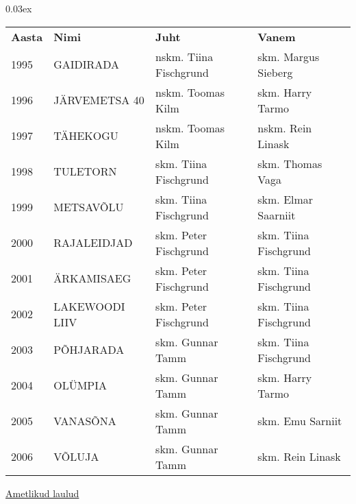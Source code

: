 \documentclass[10pt]{book}
\begin{document}
{\centering\scriptsize\arrayrulewidth 0.03ex
\begin{tabular*}{1.0\textwidth}{@{\extracolsep{\fill}}@{}l@{}@{}l@{}@{}l@{}@{}l@{}}
\bf{Aasta}	&	\bf{Nimi}				&	\bf{Juht}				&	\bf{Vanem}\\[2mm]
	1995	&	GAIDIRADA				&	nskm. Tiina Fischgrund	&	skm.  Margus Sieberg\\[2mm]
	1996	&	J\"ARVEMETSA 40			&	nskm. Toomas Kilm		&	skm. Harry Tarmo\\[2mm]
	1997	&	T\"AHEKOGU				&	nskm. Toomas Kilm		&	nskm. Rein Linask\\[2mm]
	1998	&	TULETORN				&	skm. Tiina Fischgrund	&	skm. Thomas Vaga\\[2mm]
	1999	&	METSAV\~OLU				&	skm. Tiina Fischgrund	&	skm. Elmar Saarniit\\[2mm]
	2000	&	RAJALEIDJAD				&	skm. Peter Fischgrund	&	skm. Tiina Fischgrund\\[2mm]
	2001	&	\"ARKAMISAEG			&	skm. Peter Fischgrund	&	skm. Tiina Fischgrund\\[2mm]
	2002	&	LAKEWOODI LIIV			&	skm. Peter Fischgrund	&	skm. Tiina Fischgrund\\[2mm]
	2003	&	P\~OHJARADA				&	skm. Gunnar Tamm		&	skm. Tiina Fischgrund\\[2mm]
	2004	&	OL\"UMPIA				&	skm. Gunnar Tamm		&	skm. Harry Tarmo\\[2mm]
	2005	&	VANAS\~ONA				&	skm. Gunnar Tamm		&	skm. Emu Sarniit\\[2mm]
	2006	&	V\~OLUJA				&	skm. Gunnar Tamm		&	skm. Rein Linask\\[2mm]
\end{tabular*}}\cleardoublepage
\null
{
  \samepage
  \raggedbottom
  \raggedright
  \sloppy
  \vspace{1.85in}
  \centerline{
    \underline{\large Ametlikud laulud}
  }
}
\cleardoublepage\clearpage
\end{document}

